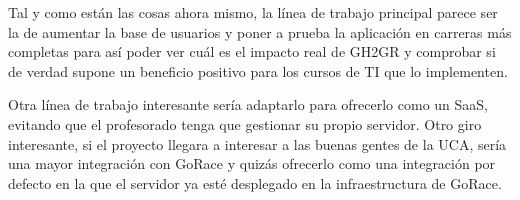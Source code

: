 Tal y como están las cosas ahora mismo, la línea de trabajo principal parece ser la de aumentar la base de usuarios y poner a prueba la aplicación en carreras más completas para así poder ver cuál es el impacto real de GH2GR y comprobar si de verdad supone un beneficio positivo para los cursos de \acrshort{TI} que lo implementen.

Otra línea de trabajo interesante sería adaptarlo para ofrecerlo como un \acrshort{SaaS}, evitando que el profesorado tenga que gestionar su propio servidor. Otro giro interesante, si el proyecto llegara a interesar a las buenas gentes de la \acrshort{UCA}, sería una mayor integración con GoRace y quizás ofrecerlo como una integración por defecto en la que el servidor ya esté desplegado en la infraestructura de GoRace.
